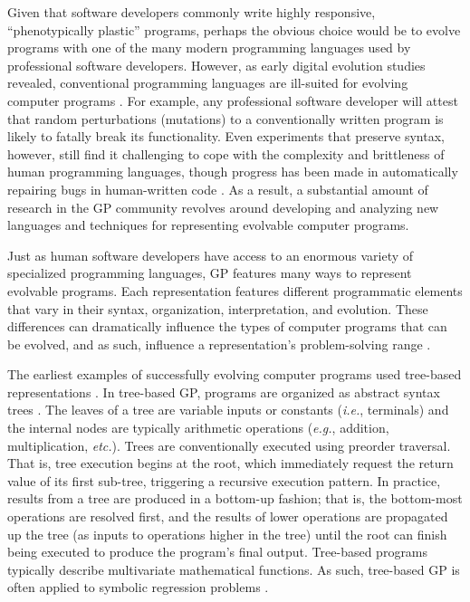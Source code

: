 Given that software developers commonly write highly responsive, ``phenotypically plastic'' programs, perhaps the obvious choice would be to evolve programs with one of the many modern programming languages used by professional software developers.
However, as early digital evolution studies revealed, conventional programming languages are ill-suited for evolving computer programs \citep{rasmussen_core_1989}.
For example, any professional software developer will attest that random perturbations (mutations) to a conventionally written program is likely to fatally break its functionality. 
Even experiments that preserve syntax, however, still find it challenging to cope with the complexity and brittleness of human programming languages, though progress has been made in automatically repairing bugs in human-written code \citep{le_goues_genprog_2012,le_goues_systematic_2012,yuan_arja_2020}.
As a result, a substantial amount of research in the GP community revolves around developing and analyzing new languages and techniques for representing evolvable computer programs.

Just as human software developers have access to an enormous variety of specialized programming languages, GP features many ways to represent evolvable programs.
Each representation features different programmatic elements that vary in their syntax, organization, interpretation, and evolution.
These differences can dramatically influence the types of computer programs that can be evolved, and as such, influence a representation's problem-solving range \citep{hintze_buffet_2019,wilson_comparison_2008}. 


The earliest examples of successfully evolving computer programs used tree-based representations \citep{forsyth_beagle_1981,koza_hierarchical_1989}.
In tree-based GP, programs are organized as abstract syntax trees \citep{poli_field_2008}.
The leaves of a tree are variable inputs or constants (\textit{i.e.}, terminals) and the internal nodes are typically arithmetic operations (\textit{e.g.}, addition, multiplication, \textit{etc.}).
Trees are conventionally executed using preorder traversal.
That is, tree execution begins at the root, which immediately request the return value of its first sub-tree, triggering a recursive execution pattern.
In practice, results from a tree are produced in a bottom-up fashion; that is, the bottom-most operations are resolved first, and the results of lower operations are propagated up the tree (as inputs to operations higher in the tree) until the root can finish being executed to produce the program's final output.
Tree-based programs typically describe multivariate mathematical functions.
As such, tree-based GP is often applied to symbolic regression problems \citep{orzechowski_where_2018}. %

